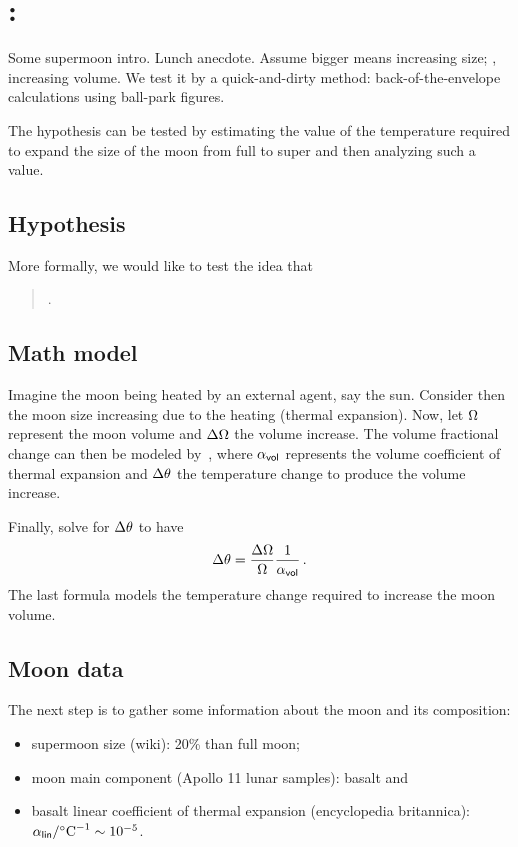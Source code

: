 \chapter{\docTitle: \docSubtitle}
%
Some supermoon intro. Lunch anecdote. Assume bigger means increasing size; \ie, increasing volume. We test it by a quick-and-dirty method: back-of-the-envelope calculations using ball-park figures.

The hypothesis can be tested by estimating the value of the temperature required to expand the size of the moon from full to super and then analyzing such a value.


\section{Hypothesis}
%
More formally, we would like to test the idea that
%
\begin{quote}\begin{center}
  .
\end{center}\end{quote}


\section{Math model}
%
Imagine the moon being heated by an external agent, say the sun. Consider then the moon size increasing due to the heating (thermal expansion). Now, let $\vol$ represent the moon volume and $\Dx\vol$ the volume increase. The volume fractional change can then be modeled by \cite[p. 403]{lienhard:2012}
%
\beq
  \dfrac{\Dx\vol}{\vol}  \kthexpv\Dx\temp\,,
\eeq
%
where $\kthexpv$ represents the volume coefficient of thermal expansion and $\Dx\temp$ the temperature change to produce the volume increase. 

Finally, solve for $\Dx\temp$ to have 
%
\begin{equation}\label{eq:moonthermalexpmodel}
  \Dx\temp = \dfrac{\Dx\vol}{\vol}\dfrac{1}{\kthexpv}\,.
\end{equation}
%
The last formula models the temperature change required to increase the moon volume.


\section{Moon data}
%
The next step is to gather some information about the moon and its composition:
%
\begin{itemize}
%
\item supermoon size (wiki): 20\%  than full moon;
%
\item moon main component (Apollo 11 lunar samples): basalt and
%
\item basalt linear coefficient of thermal expansion (encyclopedia britannica): $\kthexpl/\si{\celsius^{-1}}\sim\num{e-5}$.
%
\end{itemize}


